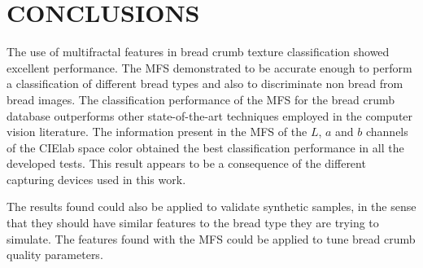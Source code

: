 \documentclass[a4paper,10pt]{article}
\begin{document}
\section{CONCLUSIONS}
The use of multifractal features in bread crumb texture classification showed excellent performance. The MFS demonstrated to be accurate enough to perform a classification of different bread types and also to discriminate non bread from bread images. The classification performance of the MFS for the bread crumb database outperforms other state-of-the-art techniques employed in the computer vision literature. The information present in the MFS of the $L$, $a$ and $b$ channels of the CIElab space color obtained the best classification performance in all the developed tests. This result appears to be a consequence of the different capturing devices used in this work.

The results found could also be applied to validate synthetic samples, in the sense that they should have similar features to the bread type they are trying to simulate. The features found with the MFS could be applied to tune bread crumb quality parameters.




\end{document}

